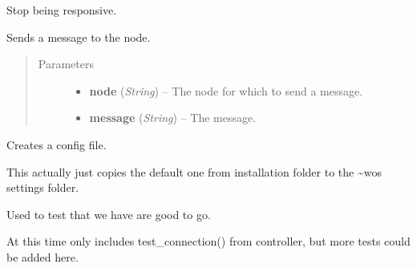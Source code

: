 \documentclass[letterpaper,10pt,english]{sphinxmanual}
\begin{document}
\begin{fulllineitems}
\begin{fulllineitems}
\end{fulllineitems}


\begin{fulllineitems}
\label{state:state.State.stop_responsive}
Stop being responsive.

\end{fulllineitems}


\begin{fulllineitems}
\label{state:state.State.swnp_send}
Sends a message to the node.
\begin{quote}\begin{description}
\item[{Parameters}] \leavevmode\begin{itemize}
\item {} 
\textbf{node} (\emph{String}) -- The node for which to send a message.

\item {} 
\textbf{message} (\emph{String}) -- The message.

\end{itemize}

\end{description}\end{quote}

\end{fulllineitems}


\end{fulllineitems}


\begin{fulllineitems}
\label{state:state.create_config}
Creates a config file.

This actually just copies the default one from installation folder
to the \textasciitilde{}wos settings folder.

\end{fulllineitems}


\begin{fulllineitems}
\label{state:state.initialization_test}
Used to test that we have are good to go.

At this time only includes test\_connection() from controller, but
more tests could be added here.

\end{fulllineitems}
\end{document}
